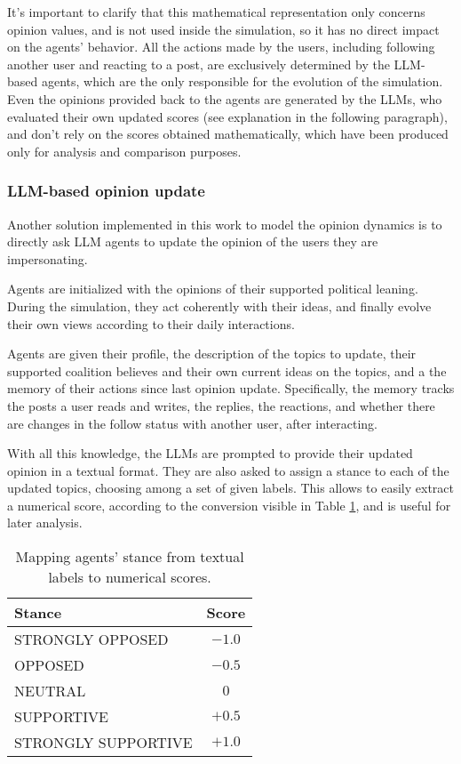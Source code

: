 \medskip
It's important to clarify that this mathematical representation only concerns opinion values, and is not used inside the simulation, so it has no direct impact on the agents' behavior.
All the actions made by the users, including following another user and reacting to a post, are exclusively determined by the LLM-based agents, which are the only responsible for the evolution of the simulation.
Even the opinions provided back to the agents are generated by the LLMs, who evaluated their own updated scores (see explanation in the following paragraph), and don't rely on the scores obtained mathematically, which have been produced only for analysis and comparison purposes.


\subsubsection{LLM-based opinion update}
Another solution implemented in this work to model the opinion dynamics is to directly ask LLM agents to update the opinion of the users they are impersonating.

Agents are initialized with the opinions of their supported political leaning. During the simulation, they act coherently with their ideas, and finally evolve their own views according to their daily interactions.

Agents are given their profile, the description of the topics to update, their supported coalition believes and their own current ideas on the topics, and a the memory of their actions since last opinion update.
Specifically, the memory tracks the posts a user reads and writes, the replies, the reactions, and whether there are changes in the follow status with another user, after interacting. 

With all this knowledge, the LLMs are prompted to provide their updated opinion in a textual format.
They are also asked to assign a stance to each of the updated topics, choosing among a set of given labels. This allows to easily extract a numerical score, according to the conversion visible in Table \ref{tab:stance}, and is useful for later analysis.

\begin{table}[h]
\centering
\begin{tabular}{|l|c|}
\hline
\textbf{Stance} & \textbf{Score} \\
\hline
STRONGLY OPPOSED   & $-1.0$ \\
OPPOSED            & $-0.5$ \\
NEUTRAL            & $0$ \\
SUPPORTIVE         & $+0.5$ \\
STRONGLY SUPPORTIVE & $+1.0$ \\
\hline
\end{tabular}
\caption{Mapping agents' stance from textual labels to numerical scores.}
\label{tab:stance}
\end{table}

